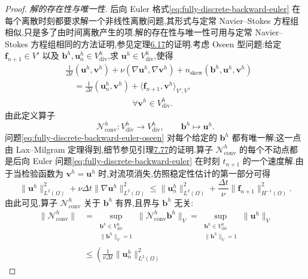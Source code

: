 \begin{proof}
\textit{解的存在性与唯一性.} 后向 Euler 格式\cref{eq:fully-discrete-backward-euler} 在每个离散时刻都要求解一个非线性离散问题,其形式与定常 Navier--Stokes 方程组相似,只是多了由时间离散产生的项.解的存在性与唯一性可用与定常 Navier--Stokes 方程组相同的方法证明,参见定理\hyperref[thm:steady-ns-existence]{6.17}的证明.考虑 Oseen 型问题:给定 $\bm{f}_{n+1}\in V'$ 以及 $\bm{b}^h,\bm{u}_n^h\in V_{\mathrm{div}}^h$,求 $\bm{u}^h\in V_{\mathrm{div}}^h$,使得
\begin{equation}\label{eq:fully-discrete-backward-euler-oseen}
  \begin{aligned}
   &\frac1{\Delta t}(\bm{u}^h,\bm{v}^h)
      +\nu(\nabla\bm{u}^h,\nabla\bm{v}^h)
      +n_{\mathrm{skew}}(\bm{b}^h,\bm{u}^h,\bm{v}^h)\\
   &\quad=\frac1{\Delta t}(\bm{u}_n^h,\bm{v}^h)
      +\langle\bm{f}_{n+1},\bm{v}^h\rangle_{V',V},\\
   &\hspace{8em}\forall\bm{v}^h\in V_{\mathrm{div}}^h.
  \end{aligned}
\end{equation}
由此定义算子
\[
  \mathcal N_{\mathrm{conv}}^h:V_{\mathrm{div}}^h\to V_{\mathrm{div}}^h,
  \qquad \bm{b}^h\mapsto\bm{u}^h.
\]
问题\cref{eq:fully-discrete-backward-euler-oseen} 对每个给定的 $\bm{b}^h$ 都有唯一解;这一点由 Lax--Milgram 定理得到,细节参见引理\hyperref[lem:imex-euler-existence-uniqueness-stability]{7.77}的证明.算子 $\mathcal N_{\mathrm{conv}}^h$ 的每个不动点都是后向 Euler 问题\cref{eq:fully-discrete-backward-euler} 在时刻 $t_{n+1}$ 的一个速度解.由于当检验函数为 $\bm{v}^h=\bm{u}^h$ 时,对流项消失,仿照稳定性估计的第一部分可得
\begin{equation}\label{eq:fully-discrete-backward-euler-oseen-stability}
  \|\bm{u}^h\|_{L^2(\Omega)}^2
   +\nu\Delta t\|\nabla\bm{u}^h\|_{L^2(\Omega)}^2
  \le \|\bm{u}_n^h\|_{L^2(\Omega)}^2
     +\frac{\Delta t}{\nu}\|\bm{f}_{n+1}\|_{H^{-1}(\Omega)}^2.
\end{equation}
由此可见,算子 $\mathcal N_{\mathrm{conv}}^h$ 关于 $\bm{b}^h$ 有界,且界与 $\bm{b}^h$ 无关:
\[
\begin{aligned}
 \|\mathcal N_{\mathrm{conv}}^h\|
  &=\sup_{\substack{\bm{b}^h\in V_{\mathrm{div}}^h\\
                     \|\bm{b}^h\|_V=1}}
       \|\mathcal N_{\mathrm{conv}}^h\bm{b}^h\|_V
   =\sup_{\substack{\bm{b}^h\in V_{\mathrm{div}}^h\\
                     \|\bm{b}^h\|_V=1}}\|\bm{u}^h\|_V\\
  &\le\left(\frac1{\nu\Delta t}\|\bm{u}_n^h\|_{L^2(\Omega)}^2

\end{aligned}\]
\end{proof}
